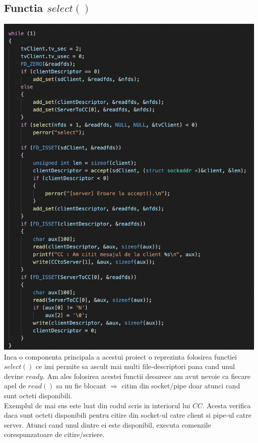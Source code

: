\documentclass{llncs}
\begin{document}
\subsection{Functia $select()$}
\includegraphics[scale=0.55]{select} \\
\hspace*{4mm} Inca o componenta principala a acestui proiect o reprezinta folosirea functiei $select()$ ce imi permite sa ascult mai multi file-descriptori pana cand unul devine $ready$. Am ales folosirea acestei functii deoarece am avut nevoie ca fiecare apel de $read()$ sa nu fie blocant $\Rightarrow$ citim din socket/pipe doar atunci cand sunt octeti disponibili. \\
\hspace*{4mm} Exemplul de mai sus este luat din codul scris in interiorul lui $CC$. Acesta verifica daca sunt octeti disponibili pentru citire din socket-ul catre client si pipe-ul catre server. Atunci cand unul dintre ei este disponibil, executa comenzile corespunzatoare de citire/scriere.
\end{document}
